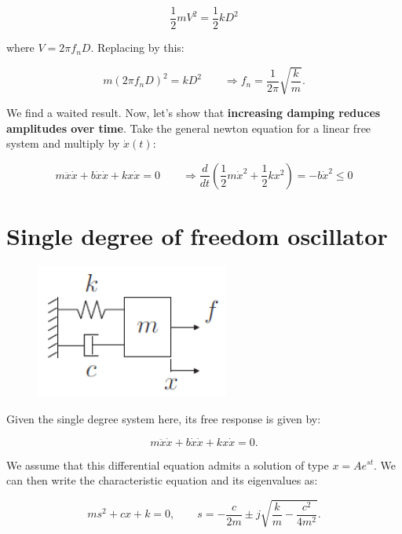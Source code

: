			\begin{equation}
			\frac{1}{2} m V^2 = \frac{1}{2} kD^2
			\end{equation}
			
			where $V = 2\pi f_n D$. Replacing by this:
			
			\begin{equation}
			 m (2\pi f_n D)^2 = kD^2 \qquad \Rightarrow f_n = \frac{1}{2\pi}\sqrt{\frac{k}{m}}.
			\end{equation}
			
			We find a waited result. Now, let's show that \textbf{increasing damping reduces amplitudes over time}. Take the general newton equation for a linear free system and multiply by $\dot{x} (t)$:
			
			\begin{equation}
			m\ddot{x}\dot{x} + b\dot{x}\dot{x} + kx\dot{x} = 0 \qquad \Rightarrow \frac{d}{dt}\left( \frac{1}{2} m\dot{x}^2 + \frac{1}{2} kx^2 \right) = -b\dot{x}^2 \leq 0
			\end{equation}
			
	\section{Single degree of freedom oscillator}
		\begin{figure}
			\vspace{-5mm}
			\includegraphics[scale=0.6]{ch1/4}
			\end{figure}
			Given the single degree system here, its free response is given by:
			
			\begin{equation}
			m\ddot{x}\dot{x} + b\dot{x}\dot{x} + kx\dot{x} = 0.
			\end{equation}
			
			We assume that this differential equation admits a solution of type $x = Ae^{st}$. We can then write the characteristic equation and its eigenvalues as:
			
			\begin{equation}
			ms^2 + cx + k = 0, \qquad s = - \frac{c}{2m} \pm j\sqrt{\frac{k}{m} -\frac{c^2}{4m^2}}.
			\end{equation}
			
